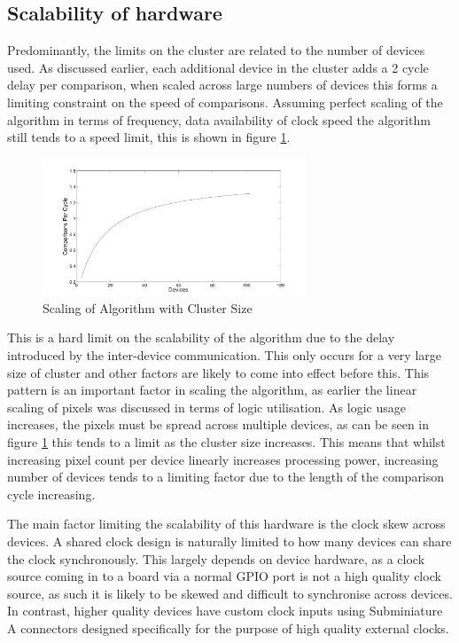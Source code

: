 \subsection{Scalability of hardware}

Predominantly, the limits on the cluster are related to the number of devices used. As discussed earlier, each additional device in the cluster adds a 2 cycle delay per comparison, when scaled across large numbers of devices this forms a limiting constraint on the speed of comparisons. Assuming perfect scaling of the algorithm in terms of frequency, data availability of clock speed the algorithm still tends to a speed limit, this is shown in figure \ref{fig:scale}.

\begin{figure}[!h]
  \centering
  \includegraphics[width=0.7\textwidth]{./figs/scalability.pdf}
  \caption{Scaling of Algorithm with Cluster Size}
    \label{fig:scale}
\end{figure}

This is a hard limit on the scalability of the algorithm due to the delay introduced by the inter-device communication. This only occurs for a very large size of cluster and other factors are likely to come into effect before this. This pattern is  an important factor in scaling the algorithm, as earlier the linear scaling of pixels was discussed in terms of logic utilisation. As logic usage increases, the pixels must be spread across multiple devices, as can be seen in figure \ref{fig:scale} this tends to a limit as the cluster size increases. This means that whilst increasing pixel count per device linearly increases processing power, increasing number of devices tends to a limiting factor due to the length of the comparison cycle increasing. 


The main factor limiting the scalability of this hardware is the clock skew across devices. A shared clock design is naturally limited to how many devices can share the clock synchronously. This largely depends on device hardware, as a clock source coming in to a board via a normal GPIO port is not a high quality clock source, as such it is likely to be skewed and difficult to synchronise across devices. In contrast, higher quality devices have custom clock inputs using Subminiature A connectors designed specifically for the purpose of high quality external clocks. 


